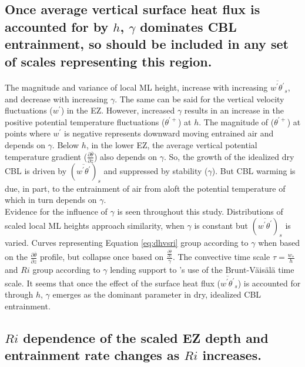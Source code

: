 \subsection{Once average vertical surface heat flux is accounted for by $h$, $\gamma$ dominates CBL entrainment, so should be included in any set of scales representing this region.}

The magnitude and variance of local ML height, increase with increasing $\overline{w^{'}\theta^{'}}_{s}$, and decrease with increasing $\gamma$.  The same can be said for the vertical velocity fluctuations ($w^{'}$) in the EZ.  However, increased $\gamma$ results in an increase in the positive potential temperature fluctuations ($\theta^{'+}$) at $h$. The magnitude of ($\theta^{'+}$) at points where $w^{'}$ is negative represents downward moving entrained air and depends on $\gamma$.  Below $h$, in the lower EZ, the average vertical potential temperature gradient ($\frac{\partial \overline{\theta}}{\partial z}$) also depends on $\gamma$. So, the growth of the idealized dry CBL is driven by $(\overline{w^{'}\theta^{'}})_{s}$ and suppressed by stability ($\gamma$). But CBL warming is due, in part, to the entrainment of air from aloft the potential temperature of which in turn depends on $\gamma$.\\

Evidence for the influence of $\gamma$ is seen throughout this study.  Distributions of scaled local ML heights approach similarity, when $\gamma$ is constant but $(\overline{w^{'}\theta^{'}})_{s}$ is varied.  Curves representing Equation \ref{eq:dhvsri} group according to $\gamma$ when based on the $\frac{\partial \overline{\theta}}{\partial z}$ profile, but collapse once based on $\frac{\frac{\partial \overline{\theta}}{\partial z}}{\gamma}$.  The convective time scale $\tau = \frac{w_{*}}{h}$ and $Ri$ group according to $\gamma$ lending support to \cite{FedConzMir04}'s use of the Brunt-V{\"a}is{\"a}l{\"a} time scale.  It seems that once the effect of the surface heat flux ($\overline{w^{'}\theta^{'}}_{s}$) is accounted for through $h$, $\gamma$ emerges as the dominant parameter in dry, idealized CBL entrainment.\\
 
\subsection{$Ri$ dependence of the scaled EZ depth and entrainment rate changes as $Ri$ increases.}

